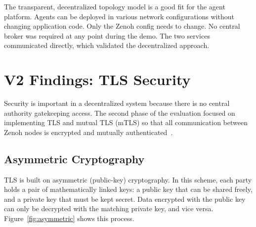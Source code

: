 \documentclass[11pt,a4paper]{article}
\begin{document}
The transparent, decentralized topology model is a good fit for the
agent platform. Agents can be deployed in various network
configurations without changing application code. Only the Zenoh
config needs to change. No central broker was required at any point
during the demo. The two services communicated directly, which
validated the decentralized approach.

\section{V2 Findings: TLS Security}

Security is important in a decentralized system because there is no
central authority gatekeeping access. The second phase of the
evaluation focused on implementing TLS and mutual TLS (mTLS) so that
all communication between Zenoh nodes is encrypted and mutually
authenticated~\citep{zenoh-tls,rfc8446}.

\subsection{Asymmetric Cryptography}

TLS is built on asymmetric (public-key) cryptography. In this scheme,
each party holds a pair of mathematically linked keys: a public key
that can be shared freely, and a private key that must be kept
secret. Data encrypted with the public key can only be decrypted with
the matching private key, and vice versa. Figure~\ref{fig:asymmetric}
shows this process.
\end{document}
